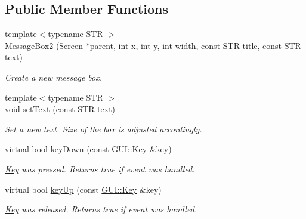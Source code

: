 \subsection*{Public Member Functions}
\begin{DoxyCompactItemize}
\item 
\hypertarget{classGUI_1_1MessageBox2_a106f58b4e83d3a9ecd2d07d5d9ab82d6}{{\footnotesize template$<$typename S\-T\-R $>$ }\\\hyperlink{classGUI_1_1MessageBox2_a106f58b4e83d3a9ecd2d07d5d9ab82d6}{Message\-Box2} (\hyperlink{classGUI_1_1Screen}{Screen} $\ast$\hyperlink{classGUI_1_1Window_a2e593ff65e7702178d82fe9010a0b539}{parent}, int \hyperlink{classGUI_1_1Window_a6ca6a80ca00c9e1d8ceea8d3d99a657d}{x}, int \hyperlink{classGUI_1_1Window_a0ee8e923aff2c3661fc2e17656d37adf}{y}, int \hyperlink{classGUI_1_1Window_a6cd42974c2b9239d05dac79d284f427d}{width}, const S\-T\-R \hyperlink{classGUI_1_1ToplevelWindow_a04de191f9a57b5b584657866a4ac6843}{title}, const S\-T\-R text)}\label{classGUI_1_1MessageBox2_a106f58b4e83d3a9ecd2d07d5d9ab82d6}

\begin{DoxyCompactList}\small\item\em Create a new message box. \end{DoxyCompactList}\item 
\hypertarget{classGUI_1_1MessageBox2_a00218125eac06f18b1c4c4c2447315bf}{{\footnotesize template$<$typename S\-T\-R $>$ }\\void \hyperlink{classGUI_1_1MessageBox2_a00218125eac06f18b1c4c4c2447315bf}{set\-Text} (const S\-T\-R text)}\label{classGUI_1_1MessageBox2_a00218125eac06f18b1c4c4c2447315bf}

\begin{DoxyCompactList}\small\item\em Set a new text. Size of the box is adjusted accordingly. \end{DoxyCompactList}\item 
\hypertarget{classGUI_1_1MessageBox2_a63da40bb97bf52f8c8fa9d26fccd99fb}{virtual bool \hyperlink{classGUI_1_1MessageBox2_a63da40bb97bf52f8c8fa9d26fccd99fb}{key\-Down} (const \hyperlink{classGUI_1_1Key}{G\-U\-I\-::\-Key} \&key)}\label{classGUI_1_1MessageBox2_a63da40bb97bf52f8c8fa9d26fccd99fb}

\begin{DoxyCompactList}\small\item\em \hyperlink{classGUI_1_1Key}{Key} was pressed. Returns true if event was handled. \end{DoxyCompactList}\item 
\hypertarget{classGUI_1_1MessageBox2_a940ae400a85727bad23aee962a5ee31c}{virtual bool \hyperlink{classGUI_1_1MessageBox2_a940ae400a85727bad23aee962a5ee31c}{key\-Up} (const \hyperlink{classGUI_1_1Key}{G\-U\-I\-::\-Key} \&key)}\label{classGUI_1_1MessageBox2_a940ae400a85727bad23aee962a5ee31c}

\begin{DoxyCompactList}\small\item\em \hyperlink{classGUI_1_1Key}{Key} was released. Returns true if event was handled. \end{DoxyCompactList}\end{DoxyCompactItemize}
